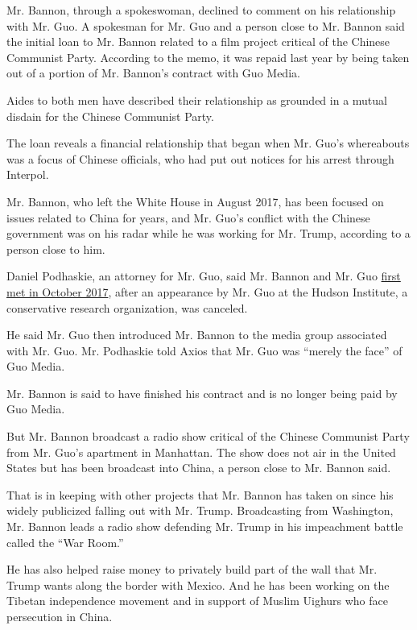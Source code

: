 Mr. Bannon, through a spokeswoman, declined to comment on his
relationship with Mr. Guo. A spokesman for Mr. Guo and a person close to
Mr. Bannon said the initial loan to Mr. Bannon related to a film project
critical of the Chinese Communist Party. According to the memo, it was
repaid last year by being taken out of a portion of Mr. Bannon's
contract with Guo Media.

Aides to both men have described their relationship as grounded in a
mutual disdain for the Chinese Communist Party.

The loan reveals a financial relationship that began when Mr. Guo's
whereabouts was a focus of Chinese officials, who had put out notices
for his arrest through Interpol.

Mr. Bannon, who left the White House in August 2017, has been focused on
issues related to China for years, and Mr. Guo's conflict with the
Chinese government was on his radar while he was working for Mr. Trump,
according to a person close to him.

Daniel Podhaskie, an attorney for Mr. Guo, said Mr. Bannon and Mr. Guo
\href{https://www.nytimes3xbfgragh.onion/2018/12/04/business/stephen-bannon-guo-wengui-china.html}{first
met in October 2017}, after an appearance by Mr. Guo at the Hudson
Institute, a conservative research organization, was canceled.

He said Mr. Guo then introduced Mr. Bannon to the media group associated
with Mr. Guo. Mr. Podhaskie told Axios that Mr. Guo was ``merely the
face'' of Guo Media.

Mr. Bannon is said to have finished his contract and is no longer being
paid by Guo Media.

But Mr. Bannon broadcast a radio show critical of the Chinese Communist
Party from Mr. Guo's apartment in Manhattan. The show does not air in
the United States but has been broadcast into China, a person close to
Mr. Bannon said.

That is in keeping with other projects that Mr. Bannon has taken on
since his widely publicized falling out with Mr. Trump. Broadcasting
from Washington, Mr. Bannon leads a radio show defending Mr. Trump in
his impeachment battle called the ``War Room.''

He has also helped raise money to privately build part of the wall that
Mr. Trump wants along the border with Mexico. And he has been working on
the Tibetan independence movement and in support of Muslim Uighurs who
face persecution in China.

